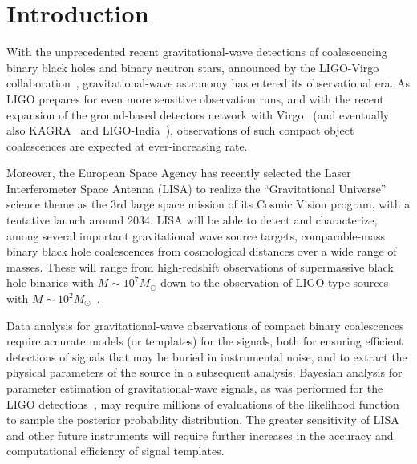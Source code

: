 \documentclass[aps,showpacs,twocolumn,
prd,superscriptaddress,nofootinbib]{revtex4-1}
\newcommand{\Msol}{M_{\odot}}
\begin{document}

\maketitle


\section{Introduction}
\label{sec:intro}

With the unprecedented recent gravitational-wave detections of coalescencing binary black holes and binary neutron stars, announced by the LIGO-Virgo collaboration~\cite{LIGO-theevent-2016, LIGO-christmasevent-2016, LIGO-O1BBH-2016, LIGO-BNSevent-2017}, gravitational-wave astronomy has entered its observational era. As LIGO prepares for even more sensitive observation runs, and with the recent expansion of the ground-based detectors network with Virgo~\cite{Virgo} (and eventually also KAGRA~\cite{KAGRA} and LIGO-India~\cite{INDIGO}), observations of such compact object coalescences are expected at ever-increasing rate.

Moreover, the European Space Agency has recently selected the Laser Interferometer Space Antenna (LISA)\cite{LISA17} to realize the ``Gravitational Universe'' science theme\cite{elisa13} as the 3rd large space mission of its Cosmic Vision program, with a tentative launch around 2034. LISA will be able to detect and characterize, among several important gravitational wave source targets, comparable-mass binary black hole coalescences from cosmological distances over a wide range of masses. These will range from high-redshift observations of supermassive black hole binaries with $M\sim 10^{7} \Msol$ down to the observation of LIGO-type sources with $M\sim 10^{2} \Msol$~\cite{Sesana16}.

Data analysis for gravitational-wave observations of compact binary coalescences require accurate models (or templates) for the signals, both for ensuring efficient detections of signals that may be buried in instrumental noise, and to extract the physical parameters of the source in a subsequent analysis. Bayesian analysis for parameter estimation of gravitational-wave signals, as was performed for the LIGO detections~\cite{LIGO-theeventPE-2016,LIGO-O1BBH-2016}, may require millions of evaluations of the likelihood function to sample the posterior probability distribution. The greater sensitivity of LISA and other future instruments will require further increases in the accuracy and computational efficiency of signal templates.
\end{document}

